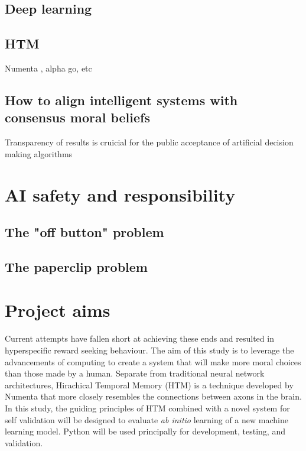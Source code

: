 \subsection{Deep learning}
\subsection{HTM}
Numenta \cite{numentahome}, alpha go, etc
\subsection{How to align intelligent systems with consensus moral beliefs}
Transparency of results is cruicial for the public acceptance of artificial decision making algorithms 

\section{AI safety and responsibility}
\subsection{The "off button" problem}
\subsection{The paperclip problem}

\section{Project aims}
Current attempts have fallen short at achieving these ends and resulted in hyperspecific reward seeking behaviour.
The aim of this study is to leverage the advancements of computing to create a system that will make more moral choices than those made by a human.
Separate from traditional neural network architectures, Hirachical Temporal Memory (HTM) is a technique developed by Numenta that more closely resembles the connections between axons in the brain.
In this study, the guiding principles of HTM combined with a novel system for self validation will be designed to evaluate \emph{ab initio} learning of a new machine learning model.
Python will be used principally for development, testing, and validation.
